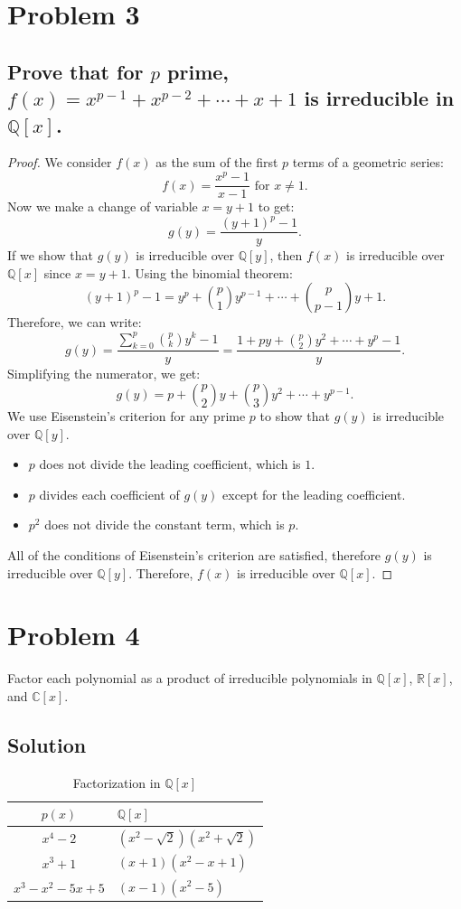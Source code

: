 \documentclass{article}
\begin{document}
\section{Problem 3}
\subsection{Prove that for $p$ prime, $f(x) = x^{p-1} + x^{p-2} + \cdots + x + 1$ is irreducible in $\mathbb{Q}[x]$.}

\begin{proof}
    We consider $f(x)$ as the sum of the first $p$ terms of a geometric series:
    \[
        f(x) = \frac{x^p - 1}{x-1} \text{ for } x \neq 1.
    \]
    Now we make a change of variable $x = y + 1$ to get:
    \[
        g(y) = \frac{(y+1)^p - 1}{y}.
    \]
    If we show that $g(y)$ is irreducible over $\mathbb{Q}[y]$, then $f(x)$ is irreducible over $\mathbb{Q}[x]$ since $x = y+1$.
    Using the binomial theorem:
    \[
        (y+1)^p - 1 = y^p + \binom{p}{1}y^{p-1} + \cdots + \binom{p}{p-1}y + 1.
    \]
    Therefore, we can write:
    \[
        g(y) = \frac{\sum_{k=0}^{p} \binom{p}{k}y^k-1}{y} = \frac{1 + py + \binom{p}{2}y^2 + \cdots + y^p - 1}{y}.
    \]
    Simplifying the numerator, we get:
    \[
        g(y) = p + \binom{p}{2}y + \binom{p}{3}y^2 + \cdots + y^{p-1}.
    \]
    We use Eisenstein's criterion for any prime $p$ to show that $g(y)$ is irreducible over $\mathbb{Q}[y]$.
    \begin{itemize}
        \item $p$ does not divide the leading coefficient, which is $1$.
        \item $p$ divides each coefficient of $g(y)$ except for the leading coefficient.
        \item $p^2$ does not divide the constant term, which is $p$.
    \end{itemize}
    All of the conditions of Eisenstein's criterion are satisfied, therefore $g(y)$ is irreducible over $\mathbb{Q}[y]$.
    Therefore, $f(x)$ is irreducible over $\mathbb{Q}[x]$.
\end{proof}

\newpage
\section{Problem 4}
Factor each polynomial as a product of irreducible polynomials in $\mathbb{Q}[x]$, $\mathbb{R}[x]$, and $\mathbb{C}[x]$.
\subsection{Solution}
\begin{table}[h]
    \centering
    \begin{tabular}{c|p{6cm}}
        $p(x)$ & $\mathbb{Q}[x]$ \\
        \hline
        $x^4-2$ & $(x^2-\sqrt{2})(x^2+\sqrt{2})$ \\
        $x^3+1$ & $(x+1)(x^2-x+1)$ \\
        $x^3-x^2-5x+5$ & $(x-1)(x^2-5)$ \\
    \end{tabular}
    \caption{Factorization in $\mathbb{Q}[x]$}
\end{table}
\end{document}
